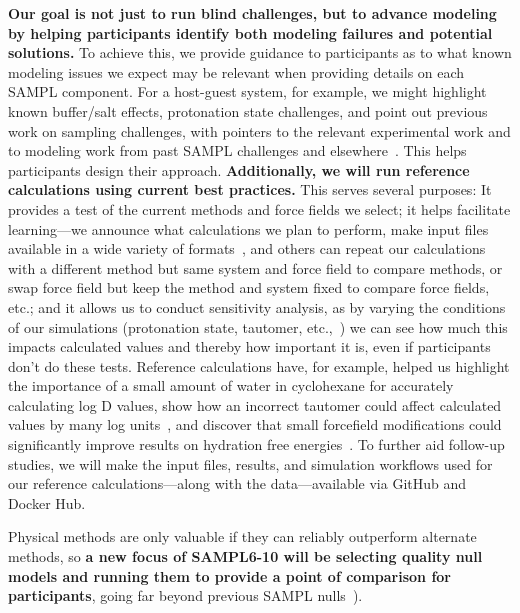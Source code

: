 \documentclass[11pt]{article}
\begin{document}
\textbf{Our goal is not just to run blind challenges, but to advance modeling by helping participants identify both modeling failures and potential solutions.} 
To achieve this, we provide guidance to participants as to what known modeling issues we expect may be relevant when providing details on each SAMPL component.
For a host-guest system, for example, we might highlight known buffer/salt effects, protonation state challenges, and point out previous work on sampling challenges, with pointers to the relevant experimental work and to modeling work from past SAMPL challenges and elsewhere~\cite{mobley_predicting_2016}.
This helps participants design their approach.
{\bf Additionally, we will run reference calculations using current best practices.} 
This serves several purposes:
It provides a test of the current methods and force fields we select; 
it helps facilitate learning---we announce what calculations we plan to perform, make input files available in a wide variety of formats~\cite{shirts_lessons_2016, yin_overview_2016, bannan_blind_2016}, and others can repeat our calculations with a different method but same system and force field to compare methods, or swap force field but keep the method and system fixed to compare force fields, etc.; 
and it allows us to conduct sensitivity analysis, as by varying the conditions of our simulations (protonation state, tautomer, etc.,~\cite{bannan_blind_2016}) we can see how much this impacts calculated values and thereby how important it is, even if participants don't do these tests.
Reference calculations have, for example, helped us highlight the importance of a small amount of water in cyclohexane for accurately calculating log D values, show how an incorrect tautomer could affect calculated values by many log units~\cite{bannan_blind_2016}, and discover that small forcefield modifications could significantly improve results on hydration free energies~\cite{mobley_blind_2014-1}.
To further aid follow-up studies, we will make the input files, results, and simulation workflows used for our reference calculations---along with the data---available via GitHub and Docker Hub.


Physical methods are only valuable if they can reliably outperform alternate methods, so \textbf{a new focus of SAMPL6-10 will be selecting quality null models and running them to provide a point of comparison for participants}, going far beyond previous SAMPL nulls~\cite{bannan_blind_2016, paranahewage_predicting_2016, muddana_sampl4_2014}).
\end{document}
